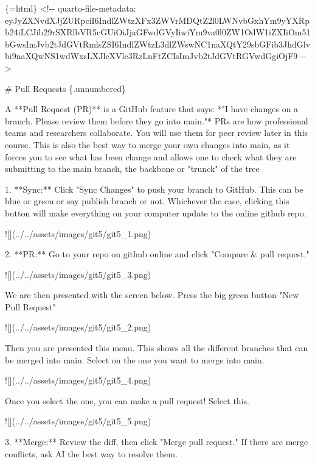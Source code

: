 \documentclass[
  letterpaper,
  DIV=11,
  numbers=noendperiod,
  oneside]{scrreprt}
\newenvironment{Shaded}{\begin{snugshade}}{\end{snugshade}}
\newcommand{\AlertTok}[1]{\textcolor[rgb]{0.68,0.00,0.00}{#1}}
\newcommand{\FunctionTok}[1]{\textcolor[rgb]{0.28,0.35,0.67}{#1}}
\newcommand{\InformationTok}[1]{\textcolor[rgb]{0.37,0.37,0.37}{#1}}
\newcommand{\NormalTok}[1]{\textcolor[rgb]{0.00,0.23,0.31}{#1}}
\newcommand{\SpecialStringTok}[1]{\textcolor[rgb]{0.13,0.47,0.30}{#1}}
\begin{document}
\begin{Shaded}
\begin{Highlighting}[numbers=left,,]
\InformationTok{\textasciigrave{}\textasciigrave{}\textasciigrave{}\{=html\}}
\InformationTok{\textless{}!{-}{-} quarto{-}file{-}metadata: eyJyZXNvdXJjZURpciI6IndlZWtzXFx3ZWVrMDQtZ2l0LWNvbGxhYm9yYXRpb24iLCJib29rSXRlbVR5cGUiOiJjaGFwdGVyIiwiYm9va0l0ZW1OdW1iZXIiOm51bGwsImJvb2tJdGVtRmlsZSI6IndlZWtzL3dlZWswNC1naXQtY29sbGFib3JhdGlvbi9naXQwNS1wdWxsLXJlcXVlc3RzLnFtZCIsImJvb2tJdGVtRGVwdGgiOjF9 {-}{-}\textgreater{}}
\InformationTok{\textasciigrave{}\textasciigrave{}\textasciigrave{}}

\FunctionTok{\# Pull Requests \{.unnumbered\}}


\NormalTok{A **Pull Request (PR)** is a GitHub feature that says: *"I have changes on a branch. Please review them before they go into \textasciigrave{}main\textasciigrave{}."* PRs are how professional teams and researchers collaborate. You will use them for peer review later in this course. This is also the best way to merge your own changes into main, as it forces you to see what has been change and allows one to check what they are submitting to the main branch, the backbone or "trunck" of the tree}

\SpecialStringTok{1.  }\NormalTok{**Sync:** Click "Sync Changes" to push your branch to GitHub. This can be blue or green or say publish branch or not. Whichever the case, clicking this button will make everything on your computer update to the online github repo.}

    \AlertTok{![](../../assets/images/git5/git5\_1.png)}

\SpecialStringTok{2.  }\NormalTok{**PR:** Go to your repo on github online and click "Compare \& pull request."}

    \AlertTok{![](../../assets/images/git5/git5\_3.png)}

\NormalTok{    We are then presented with the screen below. Press the big green button "New Pull Request"}

    \AlertTok{![](../../assets/images/git5/git5\_2.png)}

\NormalTok{    Then you are presented this menu. This shows all the different branches that can be merged into main. Select on the one you want to merge into main.}

    \AlertTok{![](../../assets/images/git5/git5\_4.png)}

\NormalTok{    Once you select the one, you can make a pull request! Select this.}

    \AlertTok{![](../../assets/images/git5/git5\_5.png)}

\SpecialStringTok{3.  }\NormalTok{**Merge:** Review the diff, then click "Merge pull request." If there are merge conflicts, ask AI the best way to resolve them.}


\end{Highlighting}
\end{Shaded}
\end{document}
